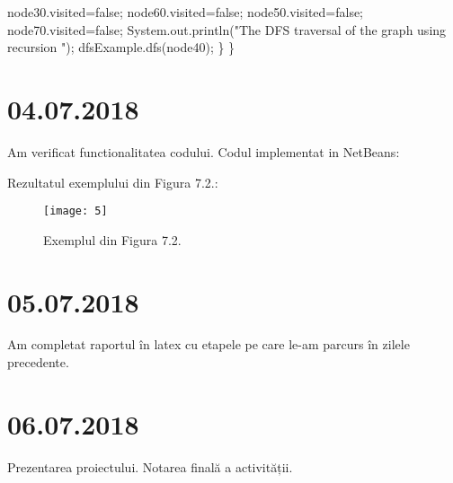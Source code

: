 \documentclass{report}
\begin{document}
		\hspace*{1cm}node30.visited=false;\newline
        \hspace*{1cm}node60.visited=false;\newline
		\hspace*{1cm}node50.visited=false;\newline
		\hspace*{1cm}node70.visited=false;\newline
  		\hspace*{1cm}System.out.println("The DFS traversal of the graph using recursion ");\newline
		\hspace*{1cm}dfsExample.dfs(node40);\newline
	\hspace*{0.8cm}\}\newline 
\}
\chapter{04.07.2018}
Am verificat functionalitatea codului. \newline
Codul implementat in NetBeans:
\begin{figure}[ht]
  \hspace*{1.5cm}\subfloat[1]{\texttt{[image: 1]}} 
  \hspace*{1.5cm}\subfloat[2]{\texttt{[image: 2]}}\newline
  \hspace*{1.5cm}\subfloat[3]{\texttt{[image: 3]}}
  \hspace*{1.5cm}\subfloat[4]{\texttt{[image: 4]}}
\end{figure}

Rezultatul exemplului din Figura 7.2.:
\begin{figure}[ht]
\centering
\texttt{[image: 5]}
\caption{Exemplul din Figura 7.2.}
\end{figure}

\chapter{05.07.2018}
Am completat raportul în latex cu etapele pe care le-am parcurs în zilele precedente.
\chapter{06.07.2018}
Prezentarea proiectului.
Notarea finală a activității.
\end{document}
